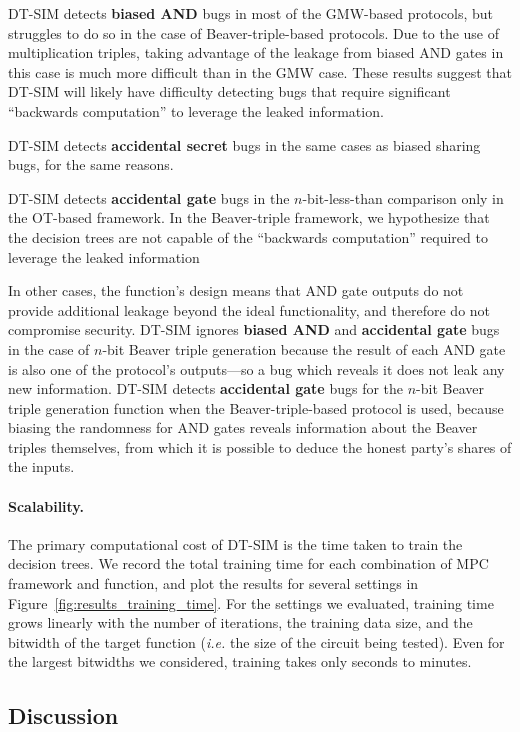 \documentclass[acmlarge, manuscript, screen, review, anonymous, table]{acmart}
\newcommand{\ie}{\textit{i.e.}\xspace}
\newcommand{\toolname}{\textsc{DT-SIM}\xspace}
\begin{document}
\toolname detects \textbf{biased AND} bugs in most of the GMW-based protocols, but struggles to do so in the case of Beaver-triple-based protocols. Due to the use of multiplication triples, taking advantage of the leakage from biased AND gates in this case is much more difficult than in the GMW case. These results suggest that \toolname will likely have difficulty detecting bugs that require significant ``backwards computation'' to leverage the leaked information.

\toolname detects \textbf{accidental secret} bugs in the same cases as biased sharing bugs, for the same reasons.

\toolname detects \textbf{accidental gate} bugs in the $n$-bit-less-than comparison only in the OT-based framework.
In the Beaver-triple framework, we hypothesize that the decision trees are not capable of the ``backwards computation''
required to leverage the leaked information

In other cases, the function's design means that AND gate outputs do not provide additional leakage beyond the ideal functionality,
and therefore do not compromise security.
\toolname ignores \textbf{biased AND} and \textbf{accidental gate} bugs in the case of $n$-bit Beaver triple generation
because the result of each AND gate is also one of the protocol's outputs---so a bug which reveals it does not leak any new information.
\toolname detects \textbf{accidental gate} bugs for the $n$-bit Beaver triple generation function when the Beaver-triple-based protocol is used, because biasing the randomness for AND gates reveals information about the Beaver triples themselves, from which it is possible to deduce the honest party's shares of the inputs.


\paragraph{Scalability.}
The primary computational cost of \toolname is the time taken to train the decision trees. We record the total training time for each combination of MPC framework and function, and plot the results for several settings in Figure~\ref{fig:results_training_time}. For the settings we evaluated, training time grows linearly with the number of iterations, the training data size, and the bitwidth of the target function (\ie the size of the circuit being tested). Even for the largest bitwidths we considered, training takes only seconds to minutes.

\subsection{Discussion}
\end{document}
